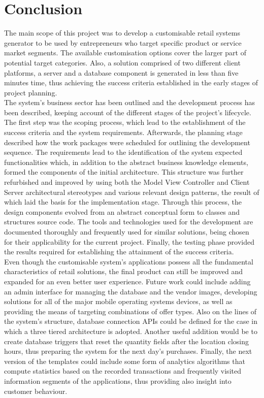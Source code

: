 \section{Conclusion}

The main scope of this project was to develop a customisable retail systems generator to be used by entrepreneurs who target specific product or service market segments. The available customisation options cover the larger part of potential target categories. Also, a solution comprised of two different client platforms, a server and a database component is generated in less than five minutes time, thus achieving the success criteria established in the early stages of project planning.\\

The system's business sector has been outlined and the development process has been described, keeping account of the different stages of the project's lifecycle. The first step was the scoping process, which lead to the establishment of the success criteria and the system requirements. Afterwards, the planning stage described how the work packages were scheduled for outlining the development sequence. The requirements lead to the identification of the system expected functionalities which, in addition to the abstract business knowledge elements, formed the components of the initial architecture. This structure was further refurbished and improved by using both the Model View Controller and Client Server architectural stereotypes and various relevant design patterns, the result of which laid the basis for the implementation stage. Through this process, the design components evolved from an abstract conceptual form to classes and structures source code. The tools and technologies used for the development are documented thoroughly and frequently used for similar solutions, being chosen for their applicability for the current project. Finally, the testing phase provided the results required for establishing the attainment of the success criteria.\\ 

Even though the customisable system's applications possess all the fundamental characteristics of retail solutions, the final product can still be improved and expanded for an even better user experience. Future work could include adding an admin interface for managing the database and the vendor images, developing solutions for all of the major mobile operating systems devices, as well as providing the means of targeting combinations of offer types. Also on the lines of the system's structure, database connection APIs could be defined for the case in which a three tiered architecture is adopted. Another useful addition would be to create database triggers that reset the quantity fields after the location closing hours, thus preparing the system for the next day's purchases. Finally, the next version of the templates could include some form of analytics algorithms that compute statistics based on the recorded transactions and frequently visited information segments of the applications, thus providing also insight into customer behaviour.\\

